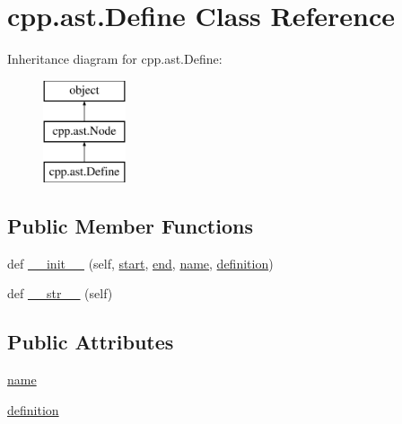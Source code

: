 \hypertarget{classcpp_1_1ast_1_1_define}{}\section{cpp.\+ast.\+Define Class Reference}
\label{classcpp_1_1ast_1_1_define}
Inheritance diagram for cpp.\+ast.\+Define\+:\begin{figure}[H]
\begin{center}
\leavevmode
\includegraphics[height=3.000000cm]{d9/d3b/classcpp_1_1ast_1_1_define}
\end{center}
\end{figure}
\subsection*{Public Member Functions}
\begin{DoxyCompactItemize}
\item 
def \mbox{\hyperlink{classcpp_1_1ast_1_1_define_ae9af61866e010a863ba9f8818ec8924c}{\+\_\+\+\_\+init\+\_\+\+\_\+}} (self, \mbox{\hyperlink{classcpp_1_1ast_1_1_node_a7b2aa97e6a049bb1a93aea48c48f1f44}{start}}, \mbox{\hyperlink{classcpp_1_1ast_1_1_node_a3c5e5246ccf619df28eca02e29d69647}{end}}, \mbox{\hyperlink{classcpp_1_1ast_1_1_define_a8879216f09e88f79d7baa49bcfa10ebd}{name}}, \mbox{\hyperlink{classcpp_1_1ast_1_1_define_a0c636652dfeb2f15e62793afea1153c9}{definition}})
\item 
def \mbox{\hyperlink{classcpp_1_1ast_1_1_define_aa89732914b19901c8d291e11f34bb627}{\+\_\+\+\_\+str\+\_\+\+\_\+}} (self)
\end{DoxyCompactItemize}
\subsection*{Public Attributes}
\begin{DoxyCompactItemize}
\item 
\mbox{\hyperlink{classcpp_1_1ast_1_1_define_a8879216f09e88f79d7baa49bcfa10ebd}{name}}
\item 
\mbox{\hyperlink{classcpp_1_1ast_1_1_define_a0c636652dfeb2f15e62793afea1153c9}{definition}}
\end{DoxyCompactItemize}


